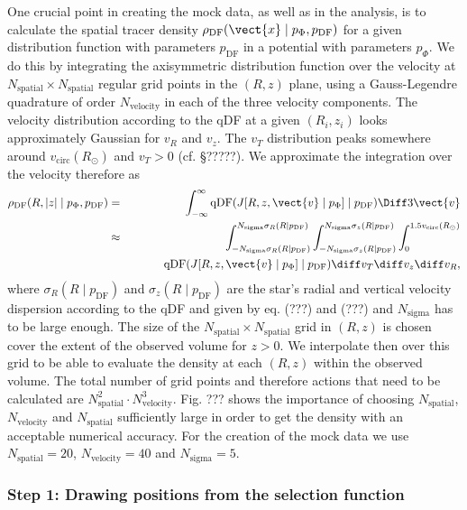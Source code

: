 One crucial point in creating the mock data, as well as in the analysis, is to calculate the spatial tracer density $\rho_\text{DF}(\vect{x} \mid p_{\Phi},p_\text{DF})$ for a given distribution function with parameters $p_\text{DF}$ in a potential with parameters $p_{\Phi}$. We do this by integrating the axisymmetric distribution function over the velocity at $N_\text{spatial} \times N_\text{spatial}$ regular grid points in the $(R,z)$ plane, using a Gauss-Legendre quadrature of order $N_\text{velocity}$ in each of the three velocity components. The velocity distribution according to the qDF at a given $(R_i,z_i)$ looks approximately Gaussian for $v_R$ and $v_z$. The $v_T$ distribution peaks somewhere around $v_\text{circ}(R_\odot)$ and $v_T > 0$ (cf. \S ?????). We approximate the integration over the velocity therefore as
\begin{eqnarray}
\rho_\text{DF}(R,|z| \mid p_{\Phi},p_\text{DF}) &=& \int_{-\infty}^{\infty} \text{qDF}(J[R,z,\vect{v} \mid p_{\Phi}] \mid p_\text{DF}) \Diff3\vect{v}  \label{eq:tracerdensity_general}\\
&\approx& \int_{-N_\text{sigma} \sigma_R(R \mid p_\text{DF})}^{N_\text{sigma} \sigma_R(R \mid p_\text{DF})} \int_{-N_\text{sigma}\sigma_z(R \mid p_\text{DF})}^{N_\text{sigma} \sigma_z(R \mid p_\text{DF})} \int_{0}^{1.5 v_\text{circ}(R_\odot)}  \nonumber\\
& & \hspace{1cm} \text{qDF}(J[R,z,\vect{v} \mid p_{\Phi}] \mid p_\text{DF}) \diff v_T \diff v_z \diff v_R, \label{eq:tracerdensity}
\end{eqnarray}
where $\sigma_R(R \mid p_\text{DF})$ and $\sigma_z(R \mid p_\text{DF})$ are the star's radial and vertical velocity dispersion according to the qDF and given by eq. (???) and (???) and $N_\text{sigma}$ has to be large enough. The size of the $N_\text{spatial} \times N_\text{spatial}$ grid in $(R,z)$ is chosen cover the extent of the observed volume for $z>0$. We interpolate then over this grid to be able to evaluate the density at each $(R,z)$ within the observed volume. The total number of grid points and therefore actions that need to be calculated are $N_\text{spatial}^2 \cdot N_\text{velocity}^3$. Fig. ??? shows the importance of choosing $N_\text{spatial}$, $N_\text{velocity}$ and $N_\text{spatial}$ sufficiently large in order to get the density with an acceptable numerical accuracy. For the creation of the mock data we use $N_\text{spatial} = 20$, $N_\text{velocity} = 40$ and $N_\text{sigma}=5$.

\subsubsection{Step 1: Drawing positions from the selection function}

